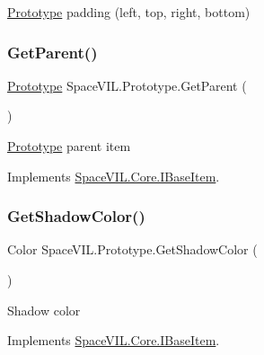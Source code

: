 \mbox{\hyperlink{class_space_v_i_l_1_1_prototype}{Prototype}} padding (left, top, right, bottom) 

\mbox{\label{class_space_v_i_l_1_1_prototype_a52d0e3c6f4e673553cd78fad20bded6b}} 
\subsubsection{\texorpdfstring{Get\+Parent()}{GetParent()}}
{\footnotesize\ttfamily \mbox{\hyperlink{class_space_v_i_l_1_1_prototype}{Prototype}} Space\+V\+I\+L.\+Prototype.\+Get\+Parent (\begin{DoxyParamCaption}{ }\end{DoxyParamCaption})\hspace{0.3cm}{\ttfamily [inline]}}



\mbox{\hyperlink{class_space_v_i_l_1_1_prototype}{Prototype}} parent item 



Implements \mbox{\hyperlink{interface_space_v_i_l_1_1_core_1_1_i_base_item}{Space\+V\+I\+L.\+Core.\+I\+Base\+Item}}.

\mbox{\label{class_space_v_i_l_1_1_prototype_add10105022c0f37835efb3efbd74ad26}} 
\subsubsection{\texorpdfstring{Get\+Shadow\+Color()}{GetShadowColor()}}
{\footnotesize\ttfamily Color Space\+V\+I\+L.\+Prototype.\+Get\+Shadow\+Color (\begin{DoxyParamCaption}{ }\end{DoxyParamCaption})\hspace{0.3cm}{\ttfamily [inline]}}



Shadow color 



Implements \mbox{\hyperlink{interface_space_v_i_l_1_1_core_1_1_i_base_item}{Space\+V\+I\+L.\+Core.\+I\+Base\+Item}}.

